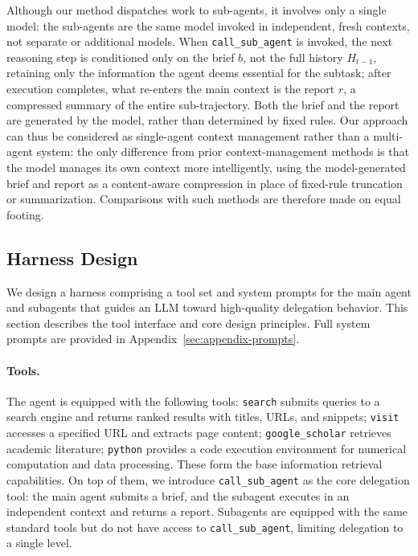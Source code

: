 \documentclass{llmxive}
\begin{document}
Although our method dispatches work to sub-agents, it involves only a single model: the sub-agents are the same model invoked in independent, fresh contexts, not separate or additional models. When \texttt{call\_sub\_agent} is invoked, the next reasoning step is conditioned only on the brief $b$, not the full history $H_{t-1}$, retaining only the information the agent deems essential for the subtask; after execution completes, what re-enters the main context is the report $r$, a compressed summary of the entire sub-trajectory. Both the brief and the report are generated by the model, rather than determined by fixed rules. Our approach can thus be considered as single-agent context management rather than a multi-agent system: the only difference from prior context-management methods is that the model manages its own context more intelligently, using the model-generated brief and report as a content-aware compression in place of fixed-rule truncation or summarization. Comparisons with such methods are therefore made on equal footing.

\subsection{Harness Design}
\label{sec:harness}

We design a harness comprising a tool set and system prompts for the main agent and subagents that guides an LLM toward high-quality delegation behavior. This section describes the tool interface and core design principles. Full system prompts are provided in Appendix~\ref{sec:appendix-prompts}.

\paragraph{Tools.}
The agent is equipped with the following tools: \texttt{search} submits queries to a search engine and returns ranked results with titles, URLs, and snippets; \texttt{visit} accesses a specified URL and extracts page content; \texttt{google\_scholar} retrieves academic literature; \texttt{python} provides a code execution environment for numerical computation and data processing. These form the base information retrieval capabilities. On top of them, we introduce \texttt{call\_sub\_agent} as the core delegation tool: the main agent submits a brief, and the subagent executes in an independent context and returns a report. Subagents are equipped with the same standard tools but do not have access to \texttt{call\_sub\_agent}, limiting delegation to a single level.
\end{document}
